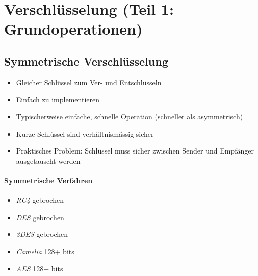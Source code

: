 \documentclass[a4paper,12pt]{article}
\begin{document}






\newpage
\section{Verschlüsselung (Teil 1: Grundoperationen)}

\subsection{Symmetrische Verschlüsselung}
\begin{itemize}
\item Gleicher Schlüssel zum Ver- und Entschlüsseln
\item Einfach zu implementieren
\item Typischerweise einfache, schnelle Operation (schneller als asymmetrisch)
\item Kurze Schlüssel sind verhältnismässig sicher
\item Praktisches Problem: Schlüssel muss sicher zwischen Sender und Empfänger ausgetauscht werden
\end{itemize}

\paragraph{Symmetrische Verfahren}
\begin{itemize}
\item \emph{RC4} gebrochen
\item \emph{DES} gebrochen
\item \emph{3DES} gebrochen
\item \emph{Camelia} 128+ bits
\item \emph{AES} 128+ bits
\end{itemize}
\end{document}

